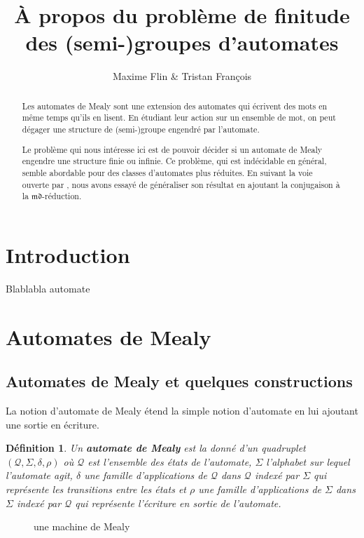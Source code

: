 \documentclass[11pt,a4paper]{article}
\title{À propos du problème de finitude des (semi-)groupes d'automates}
\author{Maxime Flin \& Tristan François}
\newtheorem{definition}{Définition}
\begin{document}
\maketitle
\begin{abstract}
  Les automates de Mealy sont une extension des automates qui écrivent des mots en même temps qu'ils en lisent. En étudiant leur action sur un ensemble de mot, on peut dégager une structure de (semi-)groupe engendré par l'automate.

  Le problème qui nous intéresse ici est de pouvoir décider si un automate de Mealy engendre une structure finie ou infinie. Ce problème, qui est indécidable en général, semble abordable pour des classes d'automates plus réduites. En suivant la voie ouverte par \citeauthor{Klimann13}, nous avons essayé de généraliser son résultat en ajoutant la conjugaison à la $\mathfrak{md}$-réduction.
\end{abstract}


\section*{Introduction}
Blablabla automate

\newpage

\section{Automates de Mealy}

\subsection{Automates de Mealy et quelques constructions}

La notion d'automate de Mealy étend la simple notion d'automate en lui ajoutant une sortie en écriture.

\begin{definition}
  Un \textbf{automate de Mealy} est la donné d'un quadruplet $\left(\mathcal{Q}, \Sigma, \delta, \rho\right)$ où $\mathcal{Q}$ est l'ensemble des états de l'automate, $\Sigma$ l'alphabet sur lequel l'automate agit, $\delta$ une famille d'applications de $\mathcal{Q}$ dans $\mathcal{Q}$ indexé par $\Sigma$ qui représente les transitions entre les états et $\rho$ une famille d'applications de $\Sigma$ dans $\Sigma$ indexé par $\mathcal{Q}$ qui représente l'écriture en sortie de l'automate.
\end{definition}

\begin{figure}[h]
  \begin{center}
    \caption{une machine de Mealy\label{fig:example}}
  \end{center}
\end{figure}
\end{document}

